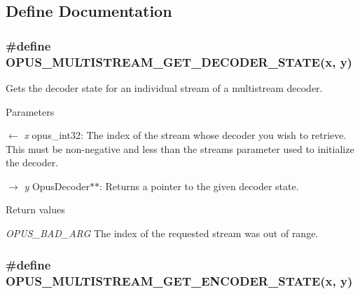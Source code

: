 \subsection{Define Documentation}
\hypertarget{group__opus__multistream__ctls_gaf0843831519b4d9b9d73391afef04a53}{
\subsubsection[{OPUS\_\-MULTISTREAM\_\-GET\_\-DECODER\_\-STATE}]{\setlength{\rightskip}{0pt plus 5cm}\#define OPUS\_\-MULTISTREAM\_\-GET\_\-DECODER\_\-STATE(x, \/  y)}}
\label{group__opus__multistream__ctls_gaf0843831519b4d9b9d73391afef04a53}


Gets the decoder state for an individual stream of a multistream decoder. 
\begin{DoxyParams}{Parameters}
\item[\mbox{$\leftarrow$} {\em x}]{\ttfamily opus\_\-int32}: The index of the stream whose decoder you wish to retrieve. This must be non-\/negative and less than the {\ttfamily streams} parameter used to initialize the decoder. \item[\mbox{$\rightarrow$} {\em y}]{\ttfamily OpusDecoder$\ast$$\ast$}: Returns a pointer to the given decoder state. \end{DoxyParams}

\begin{DoxyRetVals}{Return values}
\item[{\em OPUS\_\-BAD\_\-ARG}]The index of the requested stream was out of range. \end{DoxyRetVals}
\hypertarget{group__opus__multistream__ctls_ga4e67607eb691c4314a5de90d8c58aff0}{
\subsubsection[{OPUS\_\-MULTISTREAM\_\-GET\_\-ENCODER\_\-STATE}]{\setlength{\rightskip}{0pt plus 5cm}\#define OPUS\_\-MULTISTREAM\_\-GET\_\-ENCODER\_\-STATE(x, \/  y)}}
\label{group__opus__multistream__ctls_ga4e67607eb691c4314a5de90d8c58aff0}


